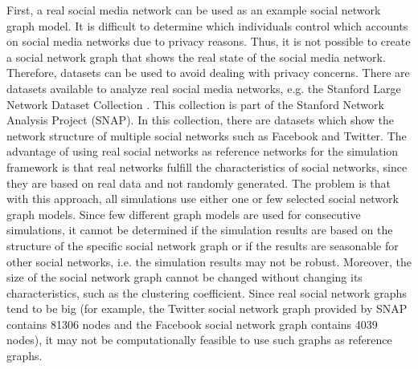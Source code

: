 First, a real social media network can be used as an example 
social network graph model. 
It is difficult to determine which individuals
control which accounts on social media networks due to privacy reasons.
Thus, it is not possible to create a social network graph that 
shows the real state of the social media network.
Therefore, datasets can be used to avoid dealing with privacy concerns. 
There are datasets available to analyze
real social media networks, e.g. the Stanford 
Large Network Dataset Collection \cite{snapnets}.
This collection is part of the Stanford Network Analysis Project (SNAP).
In this collection, there are datasets which show the network structure
of multiple social networks such as Facebook and Twitter.
The advantage of using real social networks as reference networks
for the simulation framework is that real networks fulfill the 
characteristics of social networks, since they
are based on real data and not randomly generated. The problem
is that with this approach, all simulations use either
one or few selected social network graph models. Since 
few different graph models are used for consecutive simulations,
it cannot be determined if the simulation results are based on the 
structure of the specific social network graph or if the results 
are seasonable for other social networks, i.e. the simulation results
may not be robust. Moreover, the size of the social network graph 
cannot be changed without changing its characteristics, such as 
the clustering coefficient. Since real social network graphs tend to be 
big (for example, the Twitter social network graph provided by SNAP
contains 81306 nodes and the Facebook social network graph contains 
4039 nodes), it may not be computationally feasible to use such graphs
as reference graphs.

